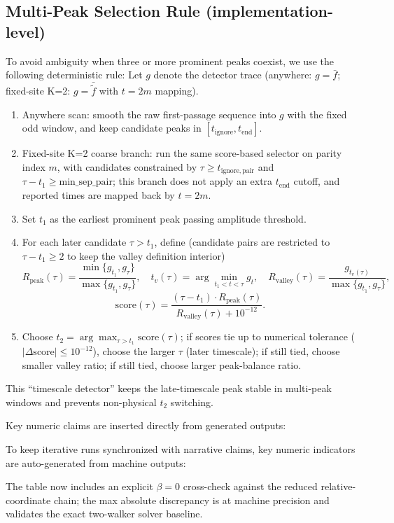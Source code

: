 \documentclass[11pt]{article}
\newcommand{\TabDir}{tables}
\begin{document}
\subsection*{Multi-Peak Selection Rule (implementation-level)}
To avoid ambiguity when three or more prominent peaks coexist, we use the following deterministic rule:
Let $g$ denote the detector trace (anywhere: $g=\bar f$; fixed-site K=2: $g=\bar{\widetilde f}$ with $t=2m$ mapping).
\begin{enumerate}[leftmargin=1.4em]
  \item Anywhere scan: smooth the raw first-passage sequence into $g$ with the fixed odd window, and keep candidate peaks in $[t_{\mathrm{ignore}},t_{\mathrm{end}}]$.
  \item Fixed-site K=2 coarse branch: run the same score-based selector on parity index $m$, with candidates constrained by $\tau\ge t_{\mathrm{ignore,pair}}$ and $\tau-t_1\ge\mathrm{min\_sep\_pair}$; this branch does not apply an extra $t_{\mathrm{end}}$ cutoff, and reported times are mapped back by $t=2m$.
  \item Set $t_1$ as the earliest prominent peak passing amplitude threshold.
  \item For each later candidate $\tau>t_1$, define
  (candidate pairs are restricted to $\tau-t_1\ge2$ to keep the valley definition interior)
  \[
  R_{\mathrm{peak}}(\tau)=\frac{\min\{g_{t_1},g_{\tau}\}}{\max\{g_{t_1},g_{\tau}\}},\quad
  t_v(\tau)=\arg\min_{t_1<t<\tau}g_t,\quad
  R_{\mathrm{valley}}(\tau)=\frac{g_{t_v(\tau)}}{\max\{g_{t_1},g_{\tau}\}},
  \]
  \[
  \mathrm{score}(\tau)=
  \frac{(\tau-t_1)\cdot R_{\mathrm{peak}}(\tau)}
  {R_{\mathrm{valley}}(\tau)+10^{-12}}.
  \]
  \item Choose $t_2=\arg\max_{\tau>t_1}\mathrm{score}(\tau)$; if scores tie up to numerical tolerance ($|\Delta\mathrm{score}|\le10^{-12}$), choose the larger $\tau$ (later timescale); if still tied, choose smaller valley ratio; if still tied, choose larger peak-balance ratio.
\end{enumerate}
This ``timescale detector'' keeps the late-timescale peak stable in multi-peak windows and prevents non-physical $t_2$ switching.

Key numeric claims are inserted directly from generated outputs:


To keep iterative runs synchronized with narrative claims, key numeric indicators are auto-generated from machine outputs:

\begin{table}[H]
  \centering
  \caption{Auto-generated key metrics for the 1D ring encounter scan.}
  \label{tab:keymetrics}
  
\end{table}
The table now includes an explicit $\beta=0$ cross-check against the reduced relative-coordinate chain; the max absolute discrepancy is at machine precision and validates the exact two-walker solver baseline.
\end{document}
